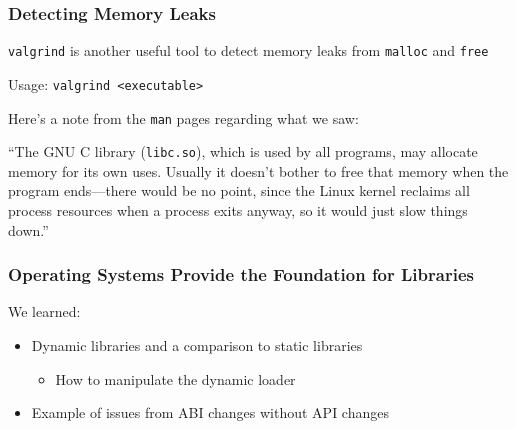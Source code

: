   \begin{frame}
    \frametitle{Detecting Memory Leaks}

    \texttt{valgrind} is another useful tool to detect memory leaks from
    \texttt{malloc} and \texttt{free}

    \hspace{1em} Usage: \texttt{valgrind <executable>}

    \vspace{2em}

    Here's a note from the \texttt{man} pages regarding what we saw:

    \vspace{1em}

    ``The GNU C library (\texttt{libc.so}), which is used by all programs,
      may allocate memory for its own uses. Usually it doesn't bother to free
      that memory when the program ends—there would be no point, since the Linux
      kernel reclaims all process resources when a process exits anyway, so it
      would just slow things down.''

    \vspace{2em}

  \end{frame}

  \begin{frame}
    \frametitle{Operating Systems Provide the Foundation for Libraries}

    We learned:
    \begin{itemize}
      \item Dynamic libraries and a comparison to static libraries
      \begin{itemize}
        \item How to manipulate the dynamic loader
      \end{itemize}
      \item Example of issues from ABI changes without API changes
    \end{itemize}
  \end{frame}


